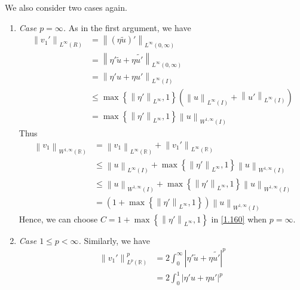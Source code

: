 \documentclass[a4paper,oneside]{article}
\numberwithin{equation}{section}
\begin{document}
We also consider two cases again.
\begin{enumerate}
\item \textit{Case $p=\infty$.} As in the first argument, we have
\begin{align}
{\left\| {{v_1}'} \right\|_{{L^\infty }\left( R \right)}} &= {\left\| {\left( {\eta \tilde u} \right)'} \right\|_{{L^\infty }\left( {0,\infty } \right)}}\\
 &= {\left\| {\eta '\tilde u + \eta \widetilde {u'}} \right\|_{{L^\infty }\left( {0,\infty } \right)}}\\
 &= {\left\| {\eta 'u + \eta u'} \right\|_{{L^\infty }\left( I \right)}}\\
 &\le \max \left\{ {{{\left\| {\eta '} \right\|}_{{L^\infty }}},1} \right\}\left( {{{\left\| u \right\|}_{{L^\infty }\left( I \right)}} + {{\left\| {u'} \right\|}_{{L^\infty }\left( I \right)}}} \right)\\
 &= \max \left\{ {{{\left\| {\eta '} \right\|}_{{L^\infty }}},1} \right\}{\left\| u \right\|_{{W^{1,\infty }}\left( I \right)}}
\end{align}
Thus
\begin{align}
{\left\| {{v_1}} \right\|_{{W^{1,\infty }}\left( \mathbb{R} \right)}} &= {\left\| {{v_1}} \right\|_{{L^\infty }\left( \mathbb{R} \right)}} + {\left\| {{v_1}'} \right\|_{{L^\infty }\left( \mathbb{R} \right)}}\\
& \le {\left\| u \right\|_{{L^\infty }\left( I \right)}} + \max \left\{ {{{\left\| {\eta '} \right\|}_{{L^\infty }}},1} \right\}{\left\| u \right\|_{{W^{1,\infty }}\left( I \right)}}\\
& \le {\left\| u \right\|_{{W^{1,\infty }}\left( I \right)}} + \max \left\{ {{{\left\| {\eta '} \right\|}_{{L^\infty }}},1} \right\}{\left\| u \right\|_{{W^{1,\infty }}\left( I \right)}}\\
& = \left( {1 + \max \left\{ {{{\left\| {\eta '} \right\|}_{{L^\infty }}},1} \right\}} \right){\left\| u \right\|_{{W^{1,\infty }}\left( I \right)}}
\end{align}
Hence, we can choose $C = 1 + \max \left\{ {{{\left\| {\eta '} \right\|}_{{L^\infty }}},1} \right\}$ in \eqref{1.160} when $p=\infty$.
\item \textit{Case $1\le p<\infty$.} Similarly, we have
\begin{align}
\left\| {{v_1}'} \right\|_{{L^p}\left( \mathbb{R} \right)}^p  &= 2\int_0^\infty  {{{\left| {\eta '\tilde u + \eta \widetilde {u'}} \right|}^p}} \\
& = 2\int_0^1 {{{\left| {\eta 'u + \eta u'} \right|}^p}} \\

\end{align}
\end{enumerate}
\end{document}
